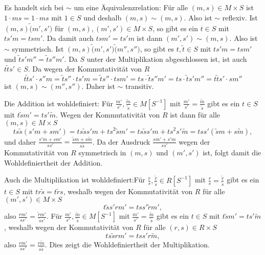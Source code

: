 \documentclass[a4paper,10pt]{article}
\theoremstyle{definition}
\begin{document}
\subsection{}
Es handelt sich bei $\sim$ um eine Äquivalenzrelation: Für  alle $(m,s) \in M \times S$ ist \mbox{$1 \cdot ms = 1 \cdot ms$} mit $1 \in S$ und deshalb $(m,s) \sim (m,s)$. Also ist $\sim$ reflexiv. Ist $(m,s) \tilde (m', s')$ für $(m,s), (m',s') \in M \times S$, so gibt es ein $t \in S$ mit $ts'm = tsm'$. Da damit auch $tsm' = ts'm$ ist dann $(m',s') \sim (m,s)$. Also ist $\sim$ symmetrisch. Ist $(m,s) \tilde (m',s') \tilde (m'', s'')$, so gibt es $t, \tilde{t} \in S$ mit $ts'm = tsm'$ und $\tilde{t}s'm'' = \tilde{t}s''m'$. Da $S$ unter der Multiplikation abgeschlossen ist, ist auch $t\tilde{t}s' \in S$. Da wegen der Kommutativität von $R$
\[
 t\tilde{t}s' \cdot s''m
 = \tilde{t}s'' \cdot ts'm
 = \tilde{t}s'' \cdot tsm'
 = ts \cdot \tilde{t}s''m'
 = ts \cdot \tilde{t}s'm''
 = t\tilde{t}s' \cdot sm''
\]
ist $(m,s) \sim (m'',s'')$. Daher ist $\sim$ transitiv.

Die Addition ist wohldefiniert: Für $\frac{m'}{s'}, \frac{\tilde{m}}{\tilde{s}} \in M[S^{-1}]$ mit $\frac{m'}{s'} = \frac{\tilde{m}}{\tilde{s}}$ gibt es ein $t \in S$ mit $t\tilde{s}m' = ts'\tilde{m}$. Wegen der Kommutativität von $R$ ist dann für alle $(m,s) \in M \times S$
\[
 ts\tilde{s}(s'm + sm')
 = ts\tilde{s}s'm + ts^2\tilde{s}m'
 = ts\tilde{s}s'm + ts^2s'\tilde{m}
 = tss'(\tilde{s}m+s\tilde{m}),
\]
und daher $\frac{s'm+sm'}{ss'} = \frac{\tilde{s}m+s\tilde{m}}{s\tilde{s}}$. Da der Ausdruck $\frac{sm'+s'm}{ss'}$ wegen der Kommutativität von $R$ symmetrisch in $(m,s)$ und $(m',s')$ ist, folgt damit die Wohldefiniertheit der Addition.

Auch die Multiplikation ist wohldefiniert:Für $\frac{r}{s},\frac{\tilde{r}}{\tilde{s}} \in R[S^{-1}]$ mit $\frac{r}{s} = \frac{\tilde{r}}{\tilde{s}}$ gibt es ein $t \in S$ mit $tr\tilde{s} = t\tilde{r}s$, weshalb wegen der Kommutativität von $R$ für alle $(m',s') \in M \times S$
\[
 t \tilde{s}s' rm' = t ss' \tilde{r}m',
\]
also $\frac{rm'}{ss'} = \frac{\tilde{r}m'}{\tilde{s}s'}$. Für $\frac{m'}{s'}, \frac{\tilde{m}}{\tilde{s}} \in M[S^{-1}]$ mit $\frac{m'}{s'} = \frac{\tilde{m}}{\tilde{s}}$ gibt es ein $t \in S$ mit $t\tilde{s}m' = ts'\tilde{m}$, weshalb wegen der Kommutativität von $R$ für alle $(r,s) \in R \times S$
\[
 t s\tilde{s} rm' = t ss' r\tilde{m},
\]
also $\frac{rm'}{ss'} = \frac{r\tilde{m}}{s\tilde{s}}$. Dies zeigt die Wohldefiniertheit der Multiplikation.
\end{document}
